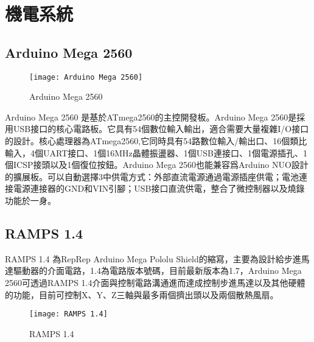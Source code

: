 \chapter{機電系統}
\section{Arduino Mega 2560}
\begin{figure}[hbt!]
\begin{center}
\texttt{[image: Arduino Mega 2560]}
\caption{\Large Arduino Mega 2560}\label{ArduinoMega2560}
\end{center}
\end{figure}
 Arduino Mega 2560 是基於ATmega2560的主控開發板。Arduino Mega 2560是採用USB接口的核心電路板。它具有54個數位輸入輸出，適合需要大量複雜I/O接口的設計。核心處理器為ATmega2560,它同時具有54路數位輸入/輸出口、16個類比輸入，4個UART接口、1個16MHz晶體振盪器、1個USB連接口、1個電源插孔、1個ICSP接頭以及1個復位按鈕。Arduino Mega 2560也能兼容爲Arduino NUO設計的擴展板。可以自動選擇3中供電方式：外部直流電源通過電源插座供電；電池連接電源連接器的GND和VIN引腳；USB接口直流供電，整合了微控制器以及燒錄功能於一身。\\[6pt]

\section{RAMPS 1.4}
 RAMPS 1.4 為RepRep Arduino Mega Pololu Shield的縮寫，主要為設計給步進馬達驅動器的介面電路，1.4為電路版本號碼，目前最新版本為1.7，Arduino Mega 2560可透過RAMPS 1.4介面與控制電路溝通進而達成控制步進馬達以及其他硬體的功能，目前可控制X、Y、Z三軸與最多兩個擠出頭以及兩個散熱風扇。\\
\begin{figure}[hbt!]
\begin{center}
\texttt{[image: RAMPS 1.4]}
\caption{\Large RAMPS 1.4}\label{Ramps1.4}
\end{center}
\end{figure}

\newpage 